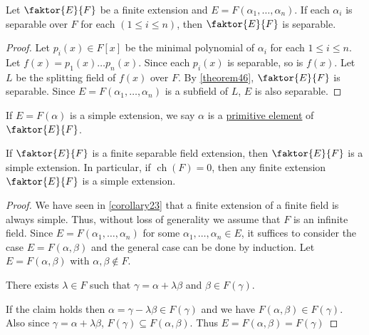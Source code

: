\documentclass[11pt]{article}
\newcommand{\quotient}[2]{\faktor{#1}{#2}}
\DeclareMathOperator{\ch}{ch}
\begin{document}
\begin{corollary}
Let $\quotient{E}{F}$ be a finite extension and $E=F(\alpha_1,\dots,\alpha_n)$.
If each $\alpha_i$ is separable over $F$ for each $(1\leq i\leq n)$, then
$\quotient{E}{F}$ is separable.
\label{corollary47}
\end{corollary}
\begin{proof}
Let $p_i(x)\in F[x]$ be the minimal polynomial of $\alpha_i$ for each $1\leq
i\leq n$. Let $f(x)=p_1(x)\dots p_n(x)$. Since each $p_i(x)$ is separable, so is
$f(x)$. Let $L$ be the splitting field of $f(x)$ over $F$. By \cref{theorem46},
$\quotient{E}{F}$ is separable. Since $E=F(\alpha_1,\dots,\alpha_n)$ is a
subfield of $L$, $E$ is also separable.
\end{proof}
\begin{definition}
If $E=F(\alpha)$ is a simple extension, we say $\alpha$ is a
\underline{primitive element} of $\quotient{E}{F}$.
\end{definition}
\begin{theorem} \label{pet}
If $\quotient{E}{F}$ is a finite separable field extension, then
$\quotient{E}{F}$ is a simple extension.  In particular, if $\ch(F)=0$, then any
finite extension $\quotient{E}{F}$ is a simple extension.
\end{theorem}
\begin{proof}
We have seen in \cref{corollary23} that a finite extension of a finite field is
always simple. Thus, without loss of generality we assume that $F$ is an
infinite field.  Since $E=F(\alpha_1,\dots,\alpha_n)$ for some
$\alpha_1,\dots,\alpha_n\in E$, it suffices to consider the case
$E=F(\alpha,\beta)$ and the general case can be done by induction. Let
$E=F(\alpha,\beta)$ with $\alpha,\beta\notin F$.
\begin{claim}
There exists $\lambda\in F$ such that $\gamma=\alpha+\lambda\beta$ and
$\beta\in F(\gamma)$.
\end{claim}
If the claim holds then $\alpha=\gamma-\lambda\beta\in F(\gamma)$ and we have
$F(\alpha,\beta)\in F(\gamma)$. Also since $\gamma=\alpha+\lambda\beta$,
$F(\gamma)\subseteq F(\alpha,\beta)$. Thus $E=F(\alpha,\beta)=F(\gamma)$
\end{proof}
\end{document}
